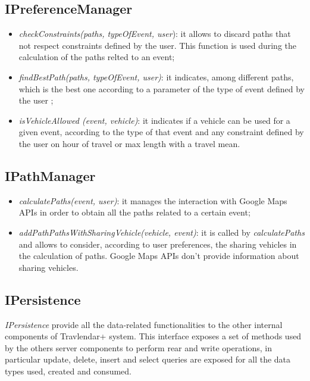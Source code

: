 \subsection{IPreferenceManager}
\begin{itemize}
\item \textit{checkConstraints(paths, typeOfEvent, user}): it allows to discard paths that not respect constraints defined by the user. This function is used during the calculation of the paths relted to an event;
\item \textit{findBestPath(paths, typeOfEvent, user)}: it indicates, among different paths, which is the best one according to a parameter of the type of event defined by the user ;
\item \textit{isVehicleAllowed (event, vehicle)}: it indicates if a vehicle can be used for a given event, according to the type of that event and any constraint defined by the user on hour of travel or max length with a travel mean.
\end{itemize}
\subsection{IPathManager}
\begin{itemize}
\item \textit{calculatePaths(event, user)}: it manages the interaction with Google Maps APIs in order to obtain all the paths related to a certain event;
\item \textit{addPathPathsWithSharingVehicle(vehicle, event)}: it is called by \textit{calculatePaths} and allows to consider, according to user preferences, the sharing vehicles in the calculation of paths. Google Maps APIs don't provide information about sharing vehicles. 
\end{itemize}

\subsection{IPersistence}
\label{subsect:IPersistence}
\textit{IPersistence} provide all the data-related functionalities to the other internal components of Travlendar+ system. This interface exposes a set of methods used by the others server components to perform rear and write operations, in particular update, delete, insert and select queries are exposed for all the data types used, created and consumed.

